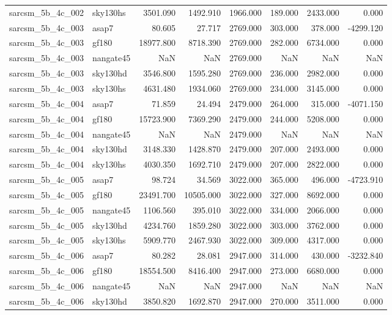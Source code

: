 \begin{tabular}{llrrrrrr}
sarcsm\_5b\_4c\_002 & sky130hs & 3501.090 & 1492.910 & 1966.000 & 189.000 & 2433.000 & 0.000 \\
sarcsm\_5b\_4c\_003 & asap7 & 80.605 & 27.717 & 2769.000 & 303.000 & 378.000 & -4299.120 \\
sarcsm\_5b\_4c\_003 & gf180 & 18977.800 & 8718.390 & 2769.000 & 282.000 & 6734.000 & 0.000 \\
sarcsm\_5b\_4c\_003 & nangate45 & NaN & NaN & 2769.000 & NaN & NaN & NaN \\
sarcsm\_5b\_4c\_003 & sky130hd & 3546.800 & 1595.280 & 2769.000 & 236.000 & 2982.000 & 0.000 \\
sarcsm\_5b\_4c\_003 & sky130hs & 4631.480 & 1934.060 & 2769.000 & 234.000 & 3145.000 & 0.000 \\
sarcsm\_5b\_4c\_004 & asap7 & 71.859 & 24.494 & 2479.000 & 264.000 & 315.000 & -4071.150 \\
sarcsm\_5b\_4c\_004 & gf180 & 15723.900 & 7369.290 & 2479.000 & 244.000 & 5208.000 & 0.000 \\
sarcsm\_5b\_4c\_004 & nangate45 & NaN & NaN & 2479.000 & NaN & NaN & NaN \\
sarcsm\_5b\_4c\_004 & sky130hd & 3148.330 & 1428.870 & 2479.000 & 207.000 & 2493.000 & 0.000 \\
sarcsm\_5b\_4c\_004 & sky130hs & 4030.350 & 1692.710 & 2479.000 & 207.000 & 2822.000 & 0.000 \\
sarcsm\_5b\_4c\_005 & asap7 & 98.724 & 34.569 & 3022.000 & 365.000 & 496.000 & -4723.910 \\
sarcsm\_5b\_4c\_005 & gf180 & 23491.700 & 10505.000 & 3022.000 & 327.000 & 8692.000 & 0.000 \\
sarcsm\_5b\_4c\_005 & nangate45 & 1106.560 & 395.010 & 3022.000 & 334.000 & 2066.000 & 0.000 \\
sarcsm\_5b\_4c\_005 & sky130hd & 4234.760 & 1859.280 & 3022.000 & 303.000 & 3762.000 & 0.000 \\
sarcsm\_5b\_4c\_005 & sky130hs & 5909.770 & 2467.930 & 3022.000 & 309.000 & 4317.000 & 0.000 \\
sarcsm\_5b\_4c\_006 & asap7 & 80.282 & 28.081 & 2947.000 & 314.000 & 430.000 & -3232.840 \\
sarcsm\_5b\_4c\_006 & gf180 & 18554.500 & 8416.400 & 2947.000 & 273.000 & 6680.000 & 0.000 \\
sarcsm\_5b\_4c\_006 & nangate45 & NaN & NaN & 2947.000 & NaN & NaN & NaN \\
sarcsm\_5b\_4c\_006 & sky130hd & 3850.820 & 1692.870 & 2947.000 & 270.000 & 3511.000 & 0.000 \\

\end{tabular}

